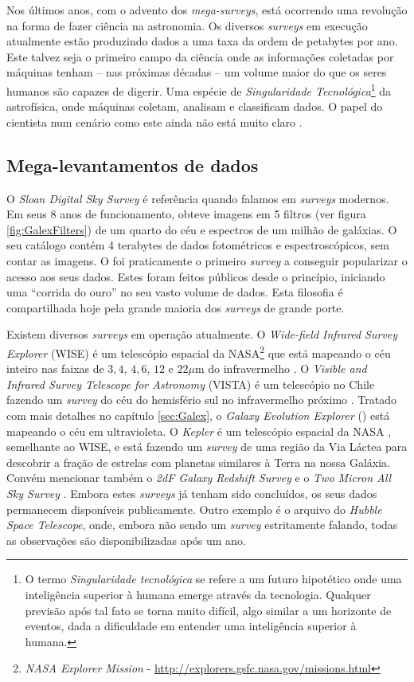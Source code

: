 Nos últimos anos, com o advento dos {\em mega-surveys}, está ocorrendo uma
revolução na forma de fazer ciência na astronomia. Os diversos {\em surveys} em
execução atualmente estão produzindo dados a uma taxa da ordem de petabytes por
ano. Este talvez seja o primeiro campo da ciência onde as informações coletadas
por máquinas tenham -- nas próximas décadas -- um volume maior do que os seres
humanos são capazes de digerir. Uma espécie de {\em Singularidade
Tecnológica}\footnote{O termo {\em Singularidade tecnológica} se refere a um
futuro hipotético onde uma inteligência superior à humana emerge através da
tecnologia. Qualquer previsão após tal fato se torna muito difícil, algo similar
a um horizonte de eventos, dada a dificuldade em entender uma inteligência
superior à humana.} da astrofísica, onde máquinas coletam, analisam e
classificam dados. O papel do cientista num cenário como este ainda não está
muito claro \citep{Norris2010}.

\subsection{Mega-levantamentos de dados}

O {\em Sloan Digital Sky Survey} \citep[\SDSS; ][]{York2000} é referência quando
falamos em {\em surveys} modernos. Em seus 8 anos de funcionamento, obteve
imagens em 5 filtros (ver figura \ref{fig:GalexFilters}) de um quarto do céu e
espectros de um milhão de galáxias. O seu catálogo contém 4 terabytes de dados
fotométricos e espectroscópicos, sem contar as imagens. O \SDSS foi praticamente
o primeiro {\em survey} a conseguir popularizar o acesso aos seus dados. Estes
foram feitos públicos desde o princípio, iniciando uma ``corrida do ouro'' no
seu vasto volume de dados. Esta filosofia é compartilhada hoje pela grande
maioria dos {\em surveys} de grande porte.

Existem diversos {\em surveys} em operação atualmente. O {\em Wide-field
Infrared Survey Explorer} (WISE) é um telescópio espacial da NASA\footnote{{\em
NASA Explorer Mission} - \url{http://explorers.gsfc.nasa.gov/missions.html}} que
está mapeando o céu inteiro nas faixas de $3,4$, $4,6$, $12$ e $22\mu$m do
infravermelho \citep{Wright2010}. O {\em Visible and Infrared Survey Telescope
for Astronomy} (VISTA) é um telescópio no Chile fazendo um {\em survey} do céu
do hemisfério sul no infravermelho próximo \citep{Born2010}. Tratado com mais
detalhes no capítulo \ref{sec:Galex}, o {\em Galaxy Evolution Explorer} (\galex)
está mapeando o céu em ultravioleta. O {\em Kepler} é um telescópio espacial da
NASA \citep{Borucki2010}, semelhante ao WISE, e está fazendo um {\em survey} de
uma região da Via Láctea para descobrir a fração de estrelas com planetas
similares à Terra na nossa Galáxia. Convém mencionar também o {\em 2dF Galaxy
Redshift Survey} \citep[2dFGRS;][]{Colless1999} e o {\em Two Micron All Sky
Survey} \citep[2MASS;][]{Skrutskie2006}. Embora estes {\em surveys} já tenham
sido concluídos, os seus dados permanecem disponíveis publicamente. Outro
exemplo é o arquivo do {\em Hubble Space Telescope}, onde, embora não sendo um
{\em survey} estritamente falando, todas as observações são disponibilizadas
após um ano.

